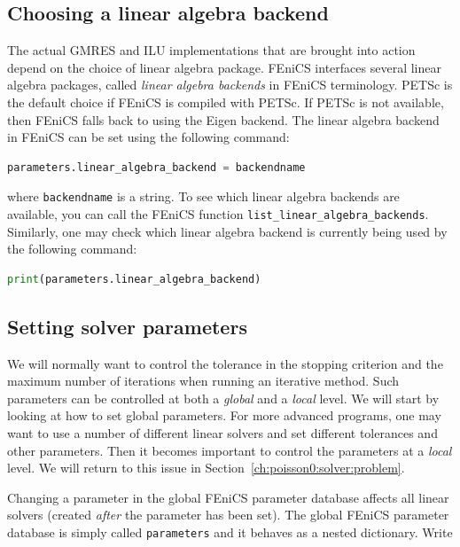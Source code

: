 \documentclass[graybox,envcountchap,sectrefs,final]{svmonodo}
\begin{document}
 

\subsection{Choosing a linear algebra backend}

The actual GMRES and ILU implementations that are brought into action
depend on the choice of linear algebra package. FEniCS interfaces
several linear algebra packages, called \emph{linear algebra backends} in
FEniCS terminology. PETSc is the default choice if FEniCS is compiled
with PETSc. If PETSc is not available, then FEniCS falls back to using
the Eigen backend. The linear algebra backend in FEniCS can be set
using the following command:

\begin{lstlisting}[language=Python,style=graycolor]
parameters.linear_algebra_backend = backendname
\end{lstlisting}
where \texttt{backendname} is a string. To see which linear algebra backends
are available, you can call the FEniCS function
\Verb!list_linear_algebra_backends!. Similarly, one may check which
linear algebra backend is currently being used by the following
command:

\begin{lstlisting}[language=Python,style=graycolor]
print(parameters.linear_algebra_backend)
\end{lstlisting}


\subsection{Setting solver parameters}

We will normally want to control the tolerance in the stopping
criterion and the maximum number of iterations when running an
iterative method. Such parameters can be controlled at both a \emph{global}
and a \emph{local} level. We will start by looking at how to set global
parameters. For more advanced programs, one may want to use a number
of different linear solvers and set different tolerances and other
parameters. Then it becomes important to control the parameters at a
\emph{local} level. We will return to this issue in Section~\ref{ch:poisson0:solver:problem}.

Changing a parameter in the global FEniCS parameter database affects
all linear solvers (created \emph{after} the parameter has been set).
The global FEniCS parameter database is simply called \texttt{parameters} and
it behaves as a nested dictionary. Write
\end{document}
